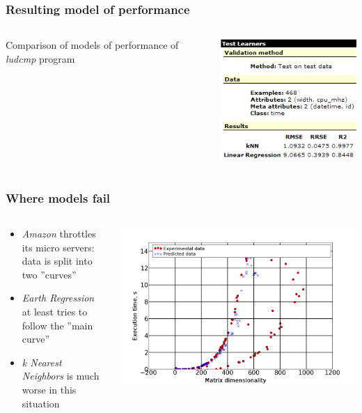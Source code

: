 \documentclass{beamer}
\begin{document}
\begin{frame}
\frametitle{Resulting model of performance}
	\begin{columns}
		\begin{column}{0.5\textwidth}
			Comparison of models of performance of \textit{ludcmp} program
		\end{column}
		\begin{column}{0.5\textwidth}
			\includegraphics[scale=0.5]{ludcmp-learners-2}
		\end{column}
	\end{columns}
\end{frame}

\begin{frame}
\frametitle{Where models fail}
	\begin{columns}
		\begin{column}{0.4\textwidth}
			\begin{itemize}
				\item \textit{Amazon} throttles its micro servers: data is split into two ''curves''
				\item \textit{Earth Regression} at least tries to follow the ''main curve''
				\item \textit{k Nearest Neighbors} is much worse in this situation
			\end{itemize}
		\end{column}
		\begin{column}{0.6\textwidth}
			\includegraphics[scale=0.175]{failure-zeon}
		\end{column}
	\end{columns}
\end{frame}
\end{document}
